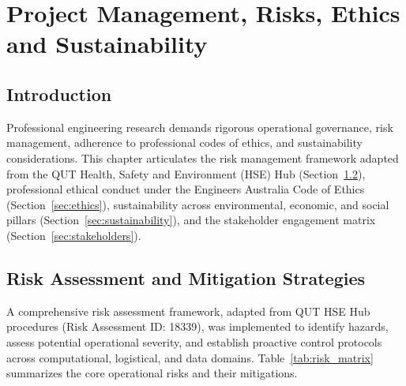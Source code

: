 
\chapter{Project Management, Risks, Ethics and Sustainability}
\label{chap:management}

\section{Introduction}
\label{sec:management_intro}
Professional engineering research demands rigorous operational governance, risk management, adherence to professional codes of ethics, and sustainability considerations. This chapter articulates the risk management framework adapted from the QUT Health, Safety and Environment (HSE) Hub (Section~\ref{sec:risk_assessment}), professional ethical conduct under the Engineers Australia Code of Ethics (Section~\ref{sec:ethics}), sustainability across environmental, economic, and social pillars (Section~\ref{sec:sustainability}), and the stakeholder engagement matrix (Section~\ref{sec:stakeholders}).

\section{Risk Assessment and Mitigation Strategies}
\label{sec:risk_assessment}
A comprehensive risk assessment framework, adapted from QUT HSE Hub procedures (Risk Assessment ID: 18339), was implemented to identify hazards, assess potential operational severity, and establish proactive control protocols across computational, logistical, and data domains. Table~\ref{tab:risk_matrix} summarizes the core operational risks and their mitigations.

